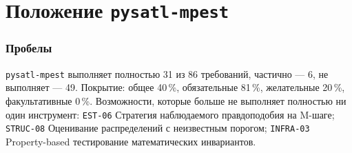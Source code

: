 \documentclass[10pt,a4paper]{article}
\begin{document}
\part{Положение \texttt{pysatl-mpest}}
\begin{landscape}
\section{Пробелы}
\texttt{pysatl-mpest} выполняет полностью 31 из 86 требований, частично --- 6, не выполняет --- 49.
Покрытие: общее 40\,\%, обязательные 81\,\%, желательные 20\,\%, факультативные 0\,\%.
Возможности, которые больше не выполняет полностью ни один инструмент: \texttt{EST-06} Стратегия наблюдаемого правдоподобия на M-шаге; \texttt{STRUC-08} Оценивание распределений с неизвестным порогом; \texttt{INFRA-03} Property-based тестирование математических инвариантов.


\end{landscape}
\end{document}
